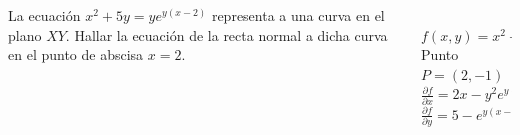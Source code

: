 \documentclass[aspectratio=149,10pt,xcolor=dvipsnames,t]{beamer}
\begin{document}
\begin{frame}
\begin{columns}
\begin{column}[T]{0.65\textwidth}
La ecuación $x^2+5y=ye^{y(x-2)}$ representa a una curva en el plano $XY$.
Hallar la ecuación de la recta normal a dicha curva en el punto de abscisa $x=2$.
\end{column}
\begin{column}[T]{0.35\textwidth}
\\
$f(x,y)=x^2+5y-ye^{y(x-2)}=0$\\
Punto $P=(2,-1)$\\
$\frac{\partial f}{\partial x} = 2x-y^2e^{y(x-2)}$\\
$\frac{\partial f}{\partial y} = 5-e^{y(x-2)}(1+y(x-2))$
\end{column}
\end{columns}
\end{frame}
\end{document}

